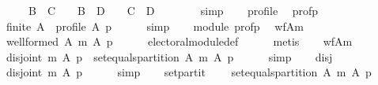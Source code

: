 \begin{isabellebody}
\ \ \ \ \ \ \ \ B\ {\isasyminter}\ C\ {\isacharequal}{\kern0pt}\ {\isacharbraceleft}{\kern0pt}{\isacharbraceright}{\kern0pt}\ {\isasymand}\ B\ {\isasyminter}\ D\ {\isacharequal}{\kern0pt}\ {\isacharbraceleft}{\kern0pt}{\isacharbraceright}{\kern0pt}\ {\isasymand}\ C\ {\isasyminter}\ D\ {\isacharequal}{\kern0pt}\ {\isacharbraceleft}{\kern0pt}{\isacharbraceright}{\kern0pt}{\isacharparenright}{\kern0pt}{\isachardoublequoteclose}\isanewline
\ \ \ \ \isamarkupfalse%
\ simp\isanewline
\ \ \isamarkupfalse%
\ profile\ \isamarkupfalse%
\ prof{\isacharunderscore}{\kern0pt}p{\isacharcolon}{\kern0pt}\isanewline
\ \ \ \ {\isachardoublequoteopen}finite\ A\ {\isasymand}\ profile\ A\ p{\isachardoublequoteclose}\isanewline
\ \ \ \ \isamarkupfalse%
\ simp\isanewline
\ \ \isamarkupfalse%
\ module\ prof{\isacharunderscore}{\kern0pt}p\ \isamarkupfalse%
\ wf{\isacharunderscore}{\kern0pt}A{\isacharunderscore}{\kern0pt}m{\isacharcolon}{\kern0pt}\isanewline
\ \ \ \ {\isachardoublequoteopen}well{\isacharunderscore}{\kern0pt}formed\ A\ {\isacharparenleft}{\kern0pt}m\ A\ p{\isacharparenright}{\kern0pt}{\isachardoublequoteclose}\isanewline
\ \ \ \ \isamarkupfalse%
\ electoral{\isacharunderscore}{\kern0pt}module{\isacharunderscore}{\kern0pt}def\isanewline
\ \ \ \ \isamarkupfalse%
\ metis\isanewline
\ \ \isamarkupfalse%
\ wf{\isacharunderscore}{\kern0pt}A{\isacharunderscore}{\kern0pt}m{\isacharunderscore}{\kern0pt}{}{\isacharcolon}{\kern0pt}\isanewline
\ \ \ \ {\isachardoublequoteopen}disjoint{}\ {\isacharparenleft}{\kern0pt}m\ A\ p{\isacharparenright}{\kern0pt}\ {\isasymand}\ set{\isacharunderscore}{\kern0pt}equals{\isacharunderscore}{\kern0pt}partition\ A\ {\isacharparenleft}{\kern0pt}m\ A\ p{\isacharparenright}{\kern0pt}{\isachardoublequoteclose}\isanewline
\ \ \ \ \isamarkupfalse%
\ simp\isanewline
\ \ \isamarkupfalse%
\ disj{}{\isacharcolon}{\kern0pt}\isanewline
\ \ \ \ {\isachardoublequoteopen}disjoint{}\ {\isacharparenleft}{\kern0pt}m\ A\ p{\isacharparenright}{\kern0pt}{\isachardoublequoteclose}\isanewline
\ \ \ \ \isamarkupfalse%
\ simp\isanewline
\ \ \isamarkupfalse%
\ set{\isacharunderscore}{\kern0pt}partit{\isacharcolon}{\kern0pt}\isanewline
\ \ \ \ {\isachardoublequoteopen}set{\isacharunderscore}{\kern0pt}equals{\isacharunderscore}{\kern0pt}partition\ A\ {\isacharparenleft}{\kern0pt}m\ A\ p{\isacharparenright}{\kern0pt}{\isachardoublequoteclose}\isanewline

\end{isabellebody}
